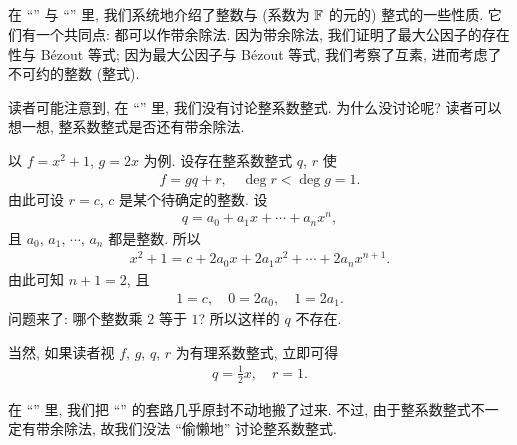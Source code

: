 \subsection*{\PolynomialsOverZAndOverQ}
\markright{\PolynomialsOverZAndOverQ}

在 ``\SomePropertiesOfIntegers'' 与 ``\SomePropertiesOfPolynomials'' 里, 我们系统地介绍了整数与 (系数为 $\mathbb{F}$ 的元的) 整式的一些性质. 它们有一个共同点: 都可以作带余除法. 因为带余除法, 我们证明了最大公因子的存在性与 Bézout 等式; 因为最大公因子与 Bézout 等式, 我们考察了互素, 进而考虑了不可约的整数 (整式).

读者可能注意到, 在 ``\SomePropertiesOfPolynomials'' 里, 我们没有讨论整系数整式. 为什么没讨论呢? 读者可以想一想, 整系数整式是否还有带余除法.

\begin{example}
    以 $f = x^2 + 1$, $g = 2x$ 为例. 设存在整系数整式 $q$, $r$ 使
    \begin{align*}
        f = gq + r, \quad \deg r < \deg g = 1.
    \end{align*}
    由此可设 $r = c$, $c$ 是某个待确定的整数. 设
    \begin{align*}
        q = a_0 + a_1 x + \cdots + a_n x^n,
    \end{align*}
    且 $a_0$, $a_1$, $\cdots$, $a_n$ 都是整数. 所以
    \begin{align*}
        x^2 + 1 = c + 2a_0 x + 2a_1 x^2 + \cdots + 2a_n x^{n+1}.
    \end{align*}
    由此可知 $n+1 = 2$, 且
    \begin{align*}
        1 = c, \quad 0 = 2a_0, \quad 1 = 2a_1.
    \end{align*}
    问题来了: 哪个整数乘 $2$ 等于 $1$? 所以这样的 $q$ 不存在.

    当然, 如果读者视 $f$, $g$, $q$, $r$ 为有理系数整式, 立即可得
    \begin{align*}
        q = \frac{1}{2}x, \quad r = 1.
    \end{align*}
\end{example}

在 ``\SomePropertiesOfPolynomials'' 里, 我们把 ``\SomePropertiesOfIntegers'' 的套路几乎原封不动地搬了过来. 不过, 由于整系数整式不一定有带余除法, 故我们没法 ``偷懒地'' 讨论整系数整式.

